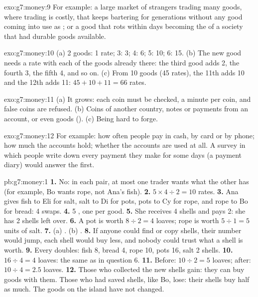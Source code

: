 \begin{solution}{exo:g7:money:9}
For example: a large market of strangers trading many goods, where trading is costly, that
keeps bartering for generations without any good coming into use as ; or a good that
rots within days becoming the  of a society that had durable goods available.
\end{solution}

\begin{solution}{exo:g7:money:10}
(a) 2 goods: 1 rate; 3: 3; 4: 6; 5: 10; 6: 15. (b) The new good needs a rate with each of
the goods already there: the third good adds 2, the fourth 3, the fifth 4, and so on.
(c) From 10 goods (45 rates), the 11th adds 10 and the 12th adds 11: $45 + 10 + 11 = 66$
rates.
\end{solution}

\begin{solution}{exo:g7:money:11}
(a) It grows: each coin must be checked, a minute per coin, and false coins are refused.
(b) Coins of another country, notes or payments from an account, or even goods ().
(c) Being hard to forge.
\end{solution}

\begin{solution}{exo:g7:money:12}
For example: how often people pay in cash, by card or by phone; how much  the accounts
hold; whether the accounts are used at all. A survey in which people write down every
payment they make for some days (a payment diary) would answer the first.
\end{solution}

\begin{solution}{pb:g7:money:1}
\textbf{1.} No: in each pair, at most one trader wants what the other has (for example, Bo
wants rope, not Ana's fish).
\textbf{2.} $5 \times 4 \div 2 = 10$ rates.
\textbf{3.} Ana gives fish to Eli for salt, salt to Di for pots, pots to Cy for rope, and rope
to Bo for bread: 4 swaps.
\textbf{4.} 5 , one per good.
\textbf{5.} She receives 4 shells and pays 2: she has 2 shells left over.
\textbf{6.} A pot is worth $8 \div 2 = 4$ loaves; rope is worth $5 \div 1 = 5$ units of salt.
\textbf{7.} (a) . (b) .
\textbf{8.} If anyone could find or copy shells, their number would jump, each shell would
buy less, and nobody could trust what a shell is worth.
\textbf{9.} Every  doubles: fish 8, bread 4, rope 10, pots 16, salt 2 shells.
\textbf{10.} $16 \div 4 = 4$ loaves: the same as in question 6.
\textbf{11.} Before: $10 \div 2 = 5$ loaves; after: $10 \div 4 = 2.5$ loaves.
\textbf{12.} Those who collected the new shells gain: they can buy goods with them. Those who
had saved shells, like Bo, lose: their shells buy half as much. The goods on the island have
not changed.
\end{solution}
